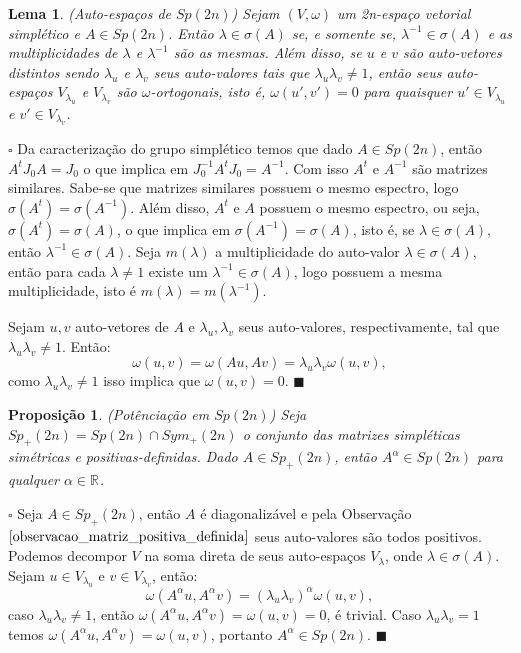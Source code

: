 \documentclass[12pt]{book}
\newtheorem{lema}[teorema]{Lema}
\newtheorem{proposicao}[teorema]{Proposição}
\newenvironment{prova}[1]{$\square$ #1}{\hfill$\blacksquare$}
\newcommand{\espectrooperador}[1]{\sigma(#1)}
\newcommand{\gruposimpletico}[1]{Sp(#1)}
\newcommand{\gruposimpleticopositivo}[1]{Sp_{+}(#1)}
\newcommand{\matrizsimetricapositiva}[1]{Sym_{+}(#1)}
\newcommand{\real}[1]{\mathbb{R}^{#1}}
\begin{document}
	\begin{lema}
		(Auto-espaços de $\gruposimpletico{2n}$) Sejam $(V, \omega)$ um 2n-espaço vetorial simplético e $A \in \gruposimpletico{2n}$. Então $\lambda \in \espectrooperador{A}$ se, e somente se, $\lambda^{-1} \in \espectrooperador{A}$ e as multiplicidades de $\lambda$ e $\lambda^{-1}$ são as mesmas. Além disso, se $u$ e $v$ são auto-vetores distintos sendo $\lambda_{u}$ e $\lambda_{v}$ seus auto-valores tais que $\lambda_{u}\lambda_{v} \neq 1$, então seus auto-espaços $V_{\lambda_{u}}$ e $V_{\lambda_{v}}$ são $\omega$-ortogonais, isto é, $\omega(u',v') = 0$ para quaisquer $u' \in V_{\lambda_{u}}$ e $v' \in V_{\lambda_{v}}$. 
	\end{lema}
	\begin{prova}
		Da caracterização do grupo simplético temos que dado $A \in \gruposimpletico{2n}$, então $A^{t}J_{0}A = J_{0}$ o que implica em $J_{0}^{-1}A^{t}J_{0} = A^{-1}$. Com isso $A^{t}$ e $A^{-1}$ são matrizes similares. Sabe-se que matrizes similares possuem o mesmo espectro, logo $\espectrooperador{A^{t}}=\espectrooperador{A^{-1}}$. Além disso, $A^{t}$ e $A$ possuem o mesmo espectro, ou seja, $\espectrooperador{A^{t}} = \espectrooperador{A}$, o que implica em $\espectrooperador{A^{-1}} = \espectrooperador{A}$, isto é, se $\lambda \in \espectrooperador{A}$, então $\lambda^{-1} \in \espectrooperador{A}$. Seja $m(\lambda)$ a multiplicidade do auto-valor $\lambda \in \espectrooperador{A}$, então para cada $\lambda \neq 1$ existe um $\lambda^{-1} \in \espectrooperador{A}$, logo possuem a mesma multiplicidade, isto é $m(\lambda) = m(\lambda^{-1})$.
		
		Sejam $u, v$ auto-vetores de $A$ e $\lambda_{u}, \lambda_{v}$ seus auto-valores, respectivamente, tal que $\lambda_{u}\lambda_{v}\neq 1$. Então:
		$$
		\omega(u,v)=\omega(Au,Av) = \lambda_{u}\lambda_{v}\omega(u,v), 
		$$
		como $\lambda_{u}\lambda_{v}\neq 1$ isso implica que $\omega(u,v)=0$.
	\end{prova}
	
	\begin{proposicao}\label{proposicao_potenciacao_grupo_simpletico}
		(Potênciação em $\gruposimpletico{2n}$) Seja $\gruposimpleticopositivo{2n} = \gruposimpletico{2n} \cap \matrizsimetricapositiva{2n}$ o conjunto das matrizes simpléticas simétricas e positivas-definidas. Dado $A \in \gruposimpleticopositivo{2n}$, então $A^{\alpha} \in \gruposimpletico{2n}$ para qualquer $\alpha \in \real{}$.
	\end{proposicao}
	\begin{prova}
		Seja $A \in \gruposimpleticopositivo{2n}$, então $A$ é diagonalizável e pela Observação $\ref{observacao_matriz_positiva_definida}$ seus auto-valores são todos positivos. Podemos decompor $V$ na soma direta de seus auto-espaços $V_{\lambda}$, onde $\lambda \in \espectrooperador{A}$. Sejam $u \in V_{\lambda_{u}}$ e $v \in V_{\lambda_{v}}$, então:
		$$
		\omega(A^{\alpha}u,A^{\alpha}v) = 		(\lambda_{u}\lambda_{v})^{\alpha}\omega(u,v), 
		$$
		caso $\lambda_{u}\lambda_{v}\neq 1$, então $\omega(A^{\alpha}u,A^{\alpha}v)=\omega(u,v)=0$, é trivial. Caso $\lambda_{u}\lambda_{v}=1$ temos $\omega(A^{\alpha}u,A^{\alpha}v) = \omega(u,v)$, portanto $A^{\alpha} \in \gruposimpletico{2n}$.
	\end{prova}
	
\end{document}

